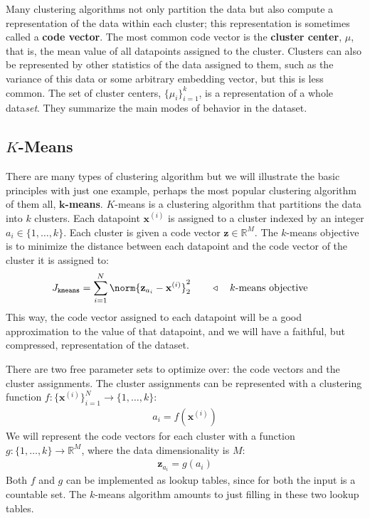 Many clustering algorithms not only partition the data but also compute a representation of the data within each cluster; this representation is sometimes called a \textbf{code vector}. The most common code vector is the \textbf{cluster center}, $\mu$, that is, the mean value of all datapoints assigned to the cluster. Clusters can also be represented by other statistics of the data assigned to them, such as the variance of this data or some arbitrary embedding vector, but this is less common. The set of cluster centers, $\{\mu_i\}_{i=1}^k$, is a representation of a whole data\textit{set}. They summarize the main modes of behavior in the dataset.

\subsection{$K$-Means}
There are many types of clustering algorithm but we will illustrate the basic principles with just one example, perhaps the most popular clustering algorithm of them all, $\mathbf{k}$\textbf{-means}. $K$-means is a clustering algorithm that partitions the data into $k$ clusters. Each datapoint $\mathbf{x}^{(i)}$ is assigned to a cluster indexed by an integer $a_i \in \{1, \ldots, k\}$. Each cluster is given a code vector $\mathbf{z} \in \mathbb{R}^M$. The $k$-means objective is to minimize the distance between each datapoint and the code vector of the cluster it is assigned to:
\begin{align}
    J_{\texttt{kmeans}} &= \sum_{i=1}^N \norm{\mathbf{z}_{a_i} - \mathbf{x}^{(i)}}^2_2 \quad\quad \triangleleft \quad\text{$k$-means objective}
\end{align}
This way, the code vector assigned to each datapoint will be a good approximation to the value of that datapoint, and we will have a faithful, but compressed, representation of the dataset. 

There are two free parameter sets to optimize over: the code vectors and the cluster assignments. The cluster assignments can be represented with a clustering function $f: \{\mathbf{x}^{(i)}\}_{i=1}^N \rightarrow \{1,\dots,k\}$:
\begin{align}
    a_i = f(\mathbf{x}^{(i)})
\end{align}
We will represent the code vectors for each cluster with a function $g: \{1,\ldots,k\} \rightarrow \mathbb{R}^M$, where the data dimensionality is $M$:
\begin{align}
    \mathbf{z}_{a_i} = g(a_i)
\end{align}
Both $f$ and $g$ can be implemented as lookup tables, since for both the input is a countable set. The $k$-means algorithm amounts to just filling in these two lookup tables.

